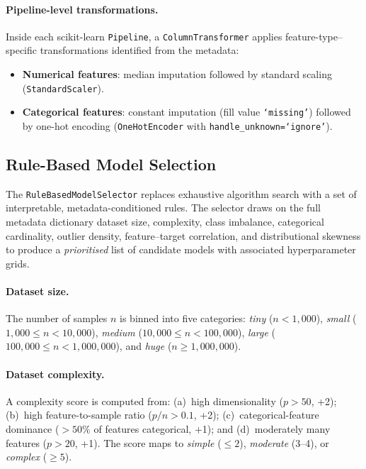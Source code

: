 \documentclass[conference]{IEEEtran}
\begin{document}
   \paragraph{Pipeline-level transformations.}
   Inside each scikit-learn \texttt{Pipeline}, a \texttt{ColumnTransformer} applies feature-type--specific transformations identified from the metadata:
   \begin{itemize}
   \item \textbf{Numerical features}: median imputation followed by standard scaling (\texttt{StandardScaler}).
   \item \textbf{Categorical features}: constant imputation (fill value \texttt{`missing'}) followed by one-hot encoding (\texttt{OneHotEncoder} with \texttt{handle\_unknown=`ignore'}).
   \end{itemize}

   \subsection{Rule-Based Model Selection}
   \label{sec:model_selection}

   The \texttt{RuleBasedModelSelector} replaces exhaustive algorithm search with a set of interpretable, metadata-conditioned rules.  The selector draws on the full metadata dictionary dataset size, complexity, class imbalance, categorical cardinality, outlier density, feature--target correlation, and distributional skewness to produce a \emph{prioritised} list of candidate models with associated hyperparameter grids.

   \paragraph{Dataset size.}
   The number of samples $n$ is binned into five categories: \emph{tiny} ($n < 1{,}000$), \emph{small} ($1{,}000 \leq n < 10{,}000$), \emph{medium} ($10{,}000 \leq n < 100{,}000$), \emph{large} ($100{,}000 \leq n < 1{,}000{,}000$), and \emph{huge} ($n \geq 1{,}000{,}000$).

   \paragraph{Dataset complexity.}
   A complexity score is computed from: (a)~high dimensionality ($p > 50$, +2); (b)~high feature-to-sample ratio ($p/n > 0.1$, +2); (c)~categorical-feature dominance ($>50\%$ of features categorical, +1); and (d)~moderately many features ($p > 20$, +1). The score maps to \emph{simple} ($\leq 2$), \emph{moderate} (3--4), or \emph{complex} ($\geq 5$).
\end{document}
